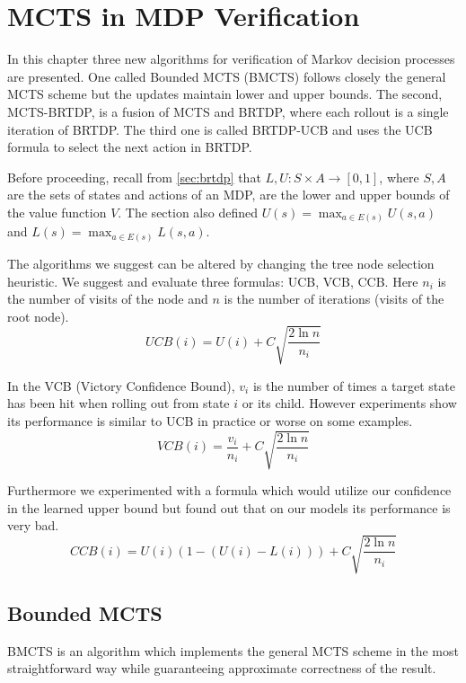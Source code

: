 \chapter{MCTS in MDP Verification}

In this chapter three new algorithms for verification of Markov decision
processes are presented. One called Bounded MCTS (BMCTS) follows
closely the general MCTS scheme but the updates maintain lower and upper
bounds. The second, MCTS-BRTDP, is a fusion of MCTS and BRTDP, where each
rollout is a single iteration of BRTDP.  The third one is called
BRTDP-UCB and uses the UCB formula to select the next action in BRTDP.

Before proceeding, recall from \autoref{sec:brtdp} that $L,U : S \times
A \to [0,1]$, where $S, A$ are the sets of states and actions of an MDP,
are the lower and upper bounds of the value function $V$.
The section also defined
$U(s) = \max_{a \in E(s)} U(s, a)$
and
$L(s) = \max_{a \in E(s)} L(s, a)$.

The algorithms we suggest can be altered by changing the tree node
selection heuristic. We suggest and evaluate three formulas: UCB, VCB,
CCB.  Here $n_i$ is the number of visits of the node and $n$ is the
number of iterations (visits of the root node).
\begin{equation*}
    UCB(i) = U(i) + C \sqrt{ \frac{2 \ln n}{n_i} }
\end{equation*}

In the VCB (Victory Confidence Bound), $v_i$ is the number of times a
target state has been hit when rolling out from state $i$ or its child.
However experiments show its performance is similar to UCB in
practice or worse on some examples.
\[
    VCB(i) = \frac{v_i}{n_i} + C \sqrt{ \frac{2 \ln n}{n_i} }
\]

Furthermore we experimented with a formula which would utilize our
confidence in the learned upper bound but found out that on our models
its performance is very bad.
\[
    CCB(i) = U(i) (1 - (U(i) - L(i))) + C \sqrt{ \frac{2 \ln n}{n_i} }
\]

\pagebreak

\section{Bounded MCTS}

BMCTS is an algorithm which implements the general MCTS scheme in the
most straightforward way while guaranteeing approximate correctness of
the result.

